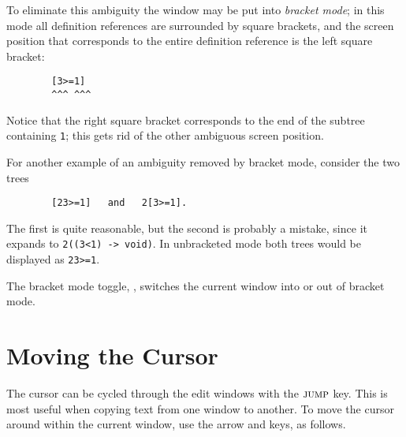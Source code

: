 To eliminate this ambiguity the window may be put into
{\em bracket{} mode\/};
in this mode all definition references are surrounded by square brackets, and the screen
position that corresponds to the entire definition reference is the left square bracket:
\begin{verbatim}
        [3>=1]
        ^^^ ^^^
\end{verbatim}
Notice that the right square bracket corresponds to the end of the subtree
containing {\tt 1}; this gets rid of the other ambiguous screen position.

For another example of an ambiguity removed by bracket mode, consider the
two trees
\begin{verbatim}
        [23>=1]   and   2[3>=1].
\end{verbatim}
The first is quite reasonable, but the second is probably a mistake, since
it expands to {\tt 2((3<1) -> void)}.
In unbracketed mode both trees would be displayed as {\tt 23>=1}.

The bracket mode toggle, \MODE, switches the current window into or
out of bracket mode.

\section{Moving the Cursor}{}

The cursor can be cycled through the edit windows with the $\mbox{\sc jump}$ key.
This is most useful when copying text from one window to another.
To move the cursor around within the current window, use the arrow and
\LONG{} keys, as follows.

